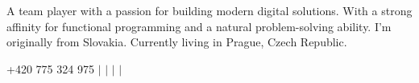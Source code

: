 
\hfill

\vspace{2pt}
\parbox{\textwidth}{
  \footnotesize
  A team player with a passion for building modern digital solutions. With a strong affinity for functional programming and a natural problem-solving ability. I'm originally from Slovakia. Currently living in Prague, Czech Republic.
}
\vspace{2pt}

\faPhone
\thinspace \thinspace
\small{+420 775 324 975} $|$
\href{mailto:contact@erikkurjak.com}{
  \thinspace \thinspace
} $|$
\href{https://linkedin.com/in/erik-kurjak-4768a2115}{
  \thinspace \thinspace
} $|$
\href{https://github.com/powdee}{
  \thinspace \thinspace
} $|$
\href{https://erikkurjak.com}{
}
